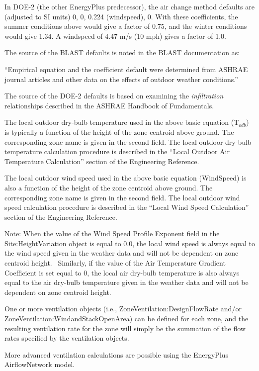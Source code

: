 In DOE-2 (the other EnergyPlus predecessor), the air change method defaults are (adjusted to SI units) 0, 0, 0.224 (windspeed), 0. With these coefficients, the summer conditions above would give a factor of 0.75, and the winter conditions would give 1.34. A windspeed of 4.47 m/s (10 mph) gives a factor of 1.0.

The source of the BLAST defaults is noted in the BLAST documentation as:

``Empirical equation and the coefficient default were determined from ASHRAE journal articles and other data on the effects of outdoor weather conditions.''

The source of the DOE-2 defaults is based on examining the \emph{infiltration} relationships described in the ASHRAE Handbook of Fundamentals.

The local outdoor dry-bulb temperature used in the above basic equation (T\(_{odb}\)) is typically a function of the height of the zone centroid above ground. The corresponding zone name is given in the second field. The local outdoor dry-bulb temperature calculation procedure is described in the ``Local Outdoor Air Temperature Calculation'' section of the Engineering Reference.

The local outdoor wind speed used in the above basic equation (WindSpeed) is also a function of the height of the zone centroid above ground. The corresponding zone name is given in the second field. The local outdoor wind speed calculation procedure is described in the ``Local Wind Speed Calculation'' section of the Engineering Reference.

Note: When the value of the Wind Speed Profile Exponent field in the Site:HeightVariation object is equal to 0.0, the local wind speed is always equal to the wind speed given in the weather data and will not be dependent on zone centroid height.~ Similarly, if the value of the Air Temperature Gradient Coefficient is set equal to 0, the local air dry-bulb temperature is also always equal to the air dry-bulb temperature given in the weather data and will not be dependent on zone centroid height.

One or more ventilation objects (i.e., ZoneVentilation:DesignFlowRate and/or ZoneVentilation:WindandStackOpenArea) can be defined for each zone, and the resulting ventilation rate for the zone will simply be the summation of the flow rates specified by the ventilation objects.

More advanced ventilation calculations are possible using the EnergyPlus AirflowNetwork model.

